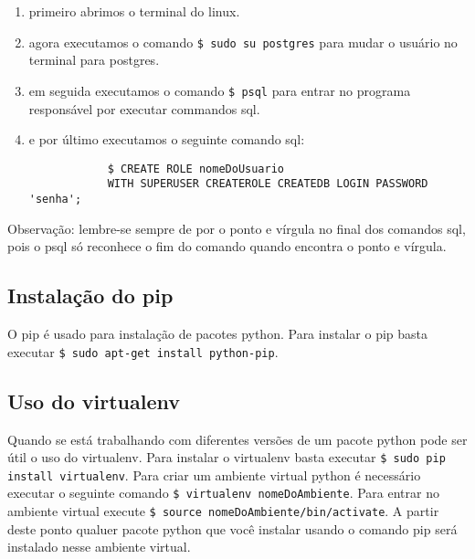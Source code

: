 \documentclass[12pt,a4paper]{article}
\begin{document}
\begin{enumerate}
	\item primeiro abrimos o terminal do linux.
	\item agora executamos o comando \verb|$ sudo su postgres| para mudar o usuário no terminal para postgres.
	\item em seguida executamos o comando \verb|$ psql| para entrar no programa responsável por executar commandos sql.
	\item e por último executamos o seguinte comando sql:
		\begin{verbatim}
			$ CREATE ROLE nomeDoUsuario 
			WITH SUPERUSER CREATEROLE CREATEDB LOGIN PASSWORD 'senha';
		\end{verbatim}
\end{enumerate}

Observação: lembre-se sempre de por o ponto e vírgula no final dos comandos sql, pois o psql só reconhece o fim do comando quando encontra o ponto e vírgula.

\subsection{Instalação do pip}
O pip é usado para instalação de pacotes python.
Para instalar o pip basta executar \verb|$ sudo apt-get install python-pip|.

\subsection{Uso do virtualenv}
Quando se está trabalhando com diferentes versões de um pacote python pode ser útil o uso do virtualenv.
Para instalar o virtualenv basta executar \verb|$ sudo pip install virtualenv|.
Para criar um ambiente virtual python é necessário executar o seguinte comando \verb|$ virtualenv nomeDoAmbiente|. Para entrar no ambiente virtual execute \verb|$ source nomeDoAmbiente/bin/activate|. A partir deste ponto qualuer pacote python que você instalar usando o comando pip será instalado nesse ambiente virtual.
\end{document}
